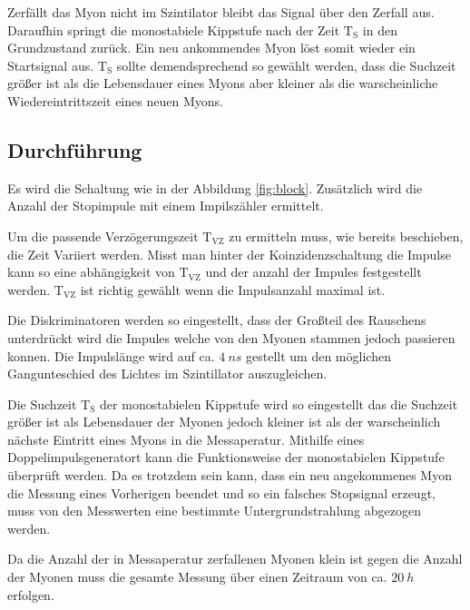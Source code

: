 Zerfällt das Myon nicht im Szintilator bleibt das Signal über den Zerfall aus.
Daraufhin springt die monostabiele Kippstufe nach der Zeit $\text{T}_{\text{S}}$ in den Grundzustand zurück.
Ein neu ankommendes Myon löst somit wieder ein Startsignal aus.
$\text{T}_{\text{S}}$ sollte demendsprechend so gewählt werden, dass die Suchzeit größer ist als die Lebensdauer eines Myons
aber kleiner als die warscheinliche Wiedereintrittszeit eines neuen Myons.

\subsection{Durchführung}
Es wird die Schaltung wie in der Abbildung \ref{fig:block}.
Zusätzlich wird die Anzahl der Stopimpule mit einem Impilszähler ermittelt.

Um die passende Verzögerungszeit $\text{T}_{\text{VZ}}$ zu ermitteln muss, wie bereits beschieben, die Zeit Variiert werden.
Misst man hinter der Koinzidenzschaltung die Impulse kann so eine abhängigkeit von $\text{T}_{\text{VZ}}$ und der anzahl der Impules festgestellt werden.
$\text{T}_{\text{VZ}}$ ist richtig gewählt wenn die Impulsanzahl maximal ist.

Die Diskriminatoren werden so eingestellt, dass der Großteil des Rauschens unterdrückt wird die Impules welche von den Myonen stammen jedoch passieren konnen.
Die Impulslänge wird auf ca. $\SI{4}{ns}$ gestellt um den möglichen Gangunteschied des Lichtes im Szintillator auszugleichen.

Die Suchzeit $\text{T}_{\text{S}}$ der monostabielen Kippstufe wird so eingestellt das die Suchzeit größer ist als Lebensdauer der Myonen jedoch kleiner ist als
der warscheinlich nächste Eintritt eines Myons in die Messaperatur.
Mithilfe eines Doppelimpulsgeneratort kann die Funktionsweise der monostabielen Kippstufe überprüft werden.
Da es trotzdem sein kann, dass ein neu angekommenes Myon die Messung eines Vorherigen beendet und so ein falsches Stopsignal erzeugt, muss von den Messwerten eine bestimmte Untergrundstrahlung abgezogen werden.

Da die Anzahl der in Messaperatur zerfallenen Myonen klein ist gegen die Anzahl der Myonen muss die gesamte Messung über einen Zeitraum von ca. $\SI{20}{h}$ erfolgen.
